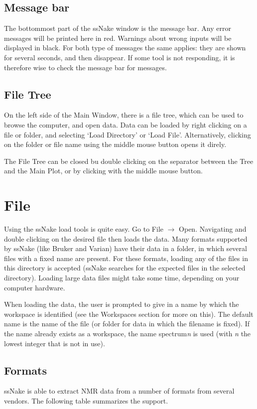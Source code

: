 \documentclass[11pt,a4paper]{article}
\begin{document}
\subsection{Message bar}
The bottommost part of the ssNake window is the message bar. Any error messages will be printed here
in red. Warnings about wrong inputs will be displayed in black. For both type of messages the same
applies: they are shown for several seconds, and then disappear. If some tool is not responding, it
is therefore wise to check the message bar for messages.


\subsection{File Tree}
On the left side of the Main Window, there is a file tree, which can be used to browse the computer,
and open data. Data can be loaded by right clicking on a file or folder, and selecting `Load
Directory' or `Load File'. Alternatively, clicking on the folder or file name using the middle mouse
button opens it direly.

The File Tree can be closed bu double clicking on the separator between the Tree and the Main Plot,
or by clicking with the middle mouse button.





\section{File}
Using the ssNake load tools is quite easy. Go to File $\rightarrow$ Open. Navigating and double clicking on the desired file then loads the data. Many formats supported by ssNake (like Bruker and Varian) have their data in a folder, in which several files with a fixed name are present. For these formats, loading any of the files in this directory is accepted (ssNake searches for the expected files in the selected directory). Loading large data files might take some time, depending on your computer hardware.

When loading the data, the user is prompted to give in a name by which the workspace is identified (see the Workspaces section for more on this). The default name is the name of the file (or folder for data in which the filename is fixed). If the name already exists as a workspace, the name spectrum\textit{n} is used (with \textit{n} the lowest integer that is not in use).


\subsection{Formats}
ssNake is able to extract NMR data from a number of formats from several vendors. The following table summarizes the support.
\end{document}
